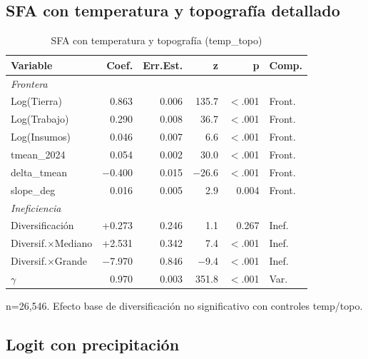 \documentclass[11pt,a4paper]{article}
\begin{document}
\subsection{SFA con temperatura y topografía detallado}

\begin{table}[H]
\centering
\caption{SFA con temperatura y topografía (temp\_topo)}
\label{tab:sfa_temp_topo}
\begin{threeparttable}
\small
\begin{tabular}{lrrrrl}
\toprule
\textbf{Variable} & \textbf{Coef.} & \textbf{Err.Est.} & \textbf{z} & \textbf{p} & \textbf{Comp.} \\
\midrule
\multicolumn{6}{l}{\textit{Frontera}} \\
Log(Tierra) & 0.863 & 0.006 & 135.7 & $<$.001 & Front. \\
Log(Trabajo) & 0.290 & 0.008 & 36.7 & $<$.001 & Front. \\
Log(Insumos) & 0.046 & 0.007 & 6.6 & $<$.001 & Front. \\
tmean\_2024 & 0.054 & 0.002 & 30.0 & $<$.001 & Front. \\
delta\_tmean & $-$0.400 & 0.015 & $-$26.6 & $<$.001 & Front. \\
slope\_deg & 0.016 & 0.005 & 2.9 & 0.004 & Front. \\
\midrule
\multicolumn{6}{l}{\textit{Ineficiencia}} \\
Diversificación & +0.273 & 0.246 & 1.1 & 0.267 & Inef. \\
Diversif.$\times$Mediano & +2.531 & 0.342 & 7.4 & $<$.001 & Inef. \\
Diversif.$\times$Grande & $-$7.970 & 0.846 & $-$9.4 & $<$.001 & Inef. \\
\midrule
$\gamma$ & 0.970 & 0.003 & 351.8 & $<$.001 & Var. \\
\bottomrule
\end{tabular}
\begin{tablenotes}
\footnotesize
\item n=26,546. Efecto base de diversificación no significativo con controles temp/topo.
\end{tablenotes}
\end{threeparttable}
\end{table}

\subsection{Logit con precipitación}
\end{document}
